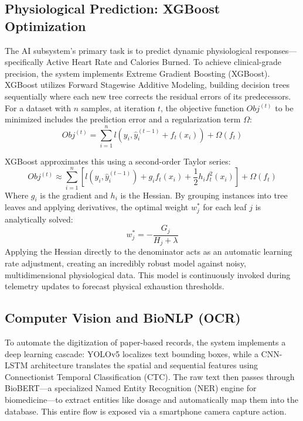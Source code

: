 \documentclass[journal, a4paper]{IEEEtran}
\begin{document}
\subsection{Physiological Prediction: XGBoost Optimization}
The AI subsystem's primary task is to predict dynamic physiological responses—specifically Active Heart Rate and Calories Burned. To achieve clinical-grade precision, the system implements Extreme Gradient Boosting (XGBoost). XGBoost utilizes Forward Stagewise Additive Modeling, building decision trees sequentially where each new tree corrects the residual errors of its predecessors. For a dataset with $n$ samples, at iteration $t$, the objective function $Obj^{(t)}$ to be minimized includes the prediction error and a regularization term $\Omega$:
\begin{equation}
Obj^{(t)} = \sum_{i=1}^{n} l(y_i, \hat{y}_i^{(t-1)} + f_t(x_i)) + \Omega(f_t)
\end{equation}

XGBoost approximates this using a second-order Taylor series:
\begin{equation}
Obj^{(t)} \approx \sum_{i=1}^{n} \left[ l(y_i, \hat{y}_i^{(t-1)}) + g_i f_t(x_i) + \frac{1}{2}h_i f_t^2(x_i) \right] + \Omega(f_t)
\end{equation}
Where $g_i$ is the gradient and $h_i$ is the Hessian. By grouping instances into tree leaves and applying derivatives, the optimal weight $w_j^*$ for each leaf $j$ is analytically solved:
\begin{equation}
w_j^* = -\frac{G_j}{H_j + \lambda}
\end{equation}
Applying the Hessian directly to the denominator acts as an automatic learning rate adjustment, creating an incredibly robust model against noisy, multidimensional physiological data. This model is continuously invoked during telemetry updates to forecast physical exhaustion thresholds.

\subsection{Computer Vision and BioNLP (OCR)}
To automate the digitization of paper-based records, the system implements a deep learning cascade: YOLOv5 localizes text bounding boxes, while a CNN-LSTM architecture translates the spatial and sequential features using Connectionist Temporal Classification (CTC). The raw text then passes through BioBERT—a specialized Named Entity Recognition (NER) engine for biomedicine—to extract entities like dosage and automatically map them into the database. This entire flow is exposed via a smartphone camera capture action.
\end{document}
